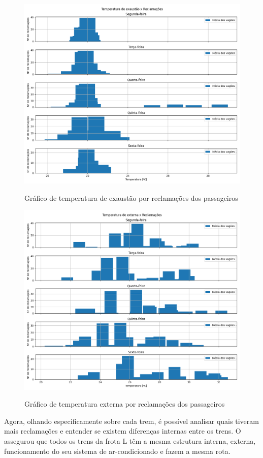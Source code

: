 \documentclass[acronym,symbols,table]{fei}
\begin{document}
\begin{figure}[!htb]
    \centering
    \caption{Gráfico de temperatura de exaustão por reclamações dos passageiros}
    \includegraphics[width=0.7\linewidth]{Imagens/Temperatura_de_exaustao_x_Reclamacoes.png}
    \label{fig:exaustao_reclamacoes}
\end{figure}

\begin{figure}[!htb]
    \centering
    \caption{Gráfico de temperatura externa por reclamações dos passageiros}
    \includegraphics[width=0.7\linewidth]{Imagens/Temperatura_de_externa_x_Reclamacoes.png}
    \label{fig:externa_reclamacoes}
\end{figure}
\newpage
Agora, olhando especificamente sobre cada trem, é possível analisar quais tiveram mais reclamações e entender se existem diferenças internas entre os trens. O \textcite{metrosp2024} assegurou que todos os trens da frota L têm a mesma estrutura interna, externa, funcionamento do seu sistema de ar-condicionado e fazem a mesma rota. 
\end{document}
